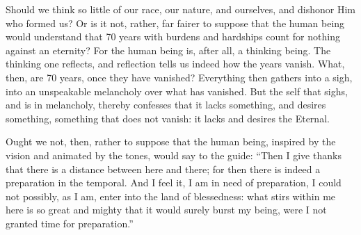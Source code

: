 \documentclass[12pt,a4paper]{book}
\begin{document}
Should we think so little of our race, our nature, and ourselves, and dishonor Him who formed us? Or is it not, rather, far fairer to suppose that the human being would understand that 70 years with burdens and hardships count for nothing against an eternity? For the human being is, after all, a thinking being. The thinking one reflects, and reflection tells us indeed how the years vanish. What, then, are 70 years, once they have vanished? Everything then gathers into a sigh, into an unspeakable melancholy over what has vanished. But the self that sighs, and is in melancholy, thereby confesses that it lacks something, and desires something, something that does not vanish: it lacks and desires the Eternal.

Ought we not, then, rather to suppose that the human being, inspired by the vision and animated by the tones, would say to the guide: ``Then I give thanks that there is a distance between here and there; for then there is indeed a preparation in the temporal. And I feel it, I am in need of preparation, I could not possibly, as I am, enter into the land of blessedness: what
stirs within me here is so great and mighty that it would surely burst my being, were I not granted time for preparation.''
\end{document}
